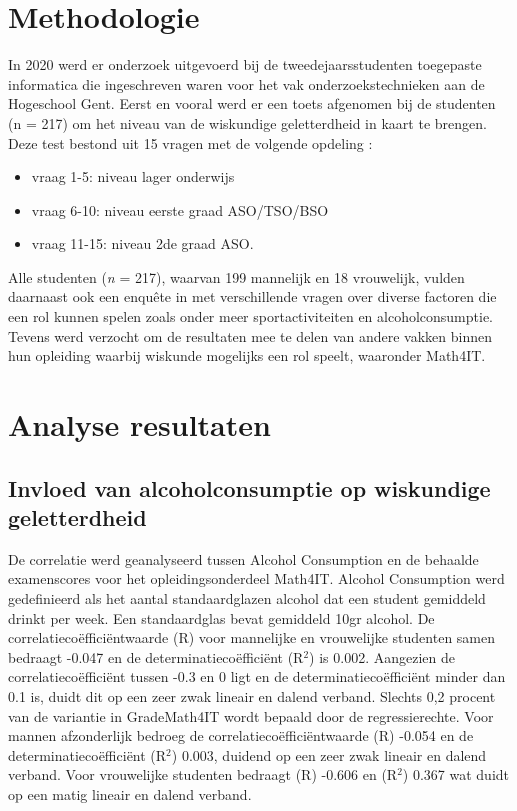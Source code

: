 \documentclass{hogent-article}
\begin{document}
\section{Methodologie}
In 2020 werd er onderzoek uitgevoerd bij de tweedejaarsstudenten toegepaste informatica die ingeschreven waren voor het vak onderzoekstechnieken aan de Hogeschool Gent. Eerst en vooral werd er een toets afgenomen bij de studenten (n = 217) om het niveau van de wiskundige geletterdheid in kaart te brengen. Deze test bestond uit 15 vragen met de volgende opdeling :
\begin{itemize}
    \item vraag 1-5: niveau lager onderwijs
    \item vraag 6-10: niveau eerste graad ASO/TSO/BSO
    \item vraag 11-15: niveau 2de graad ASO.
\end{itemize}
Alle studenten (\textit{n} = 217), waarvan 199 mannelijk en 18 vrouwelijk, vulden daarnaast ook een enquête in met verschillende vragen over diverse factoren die een rol kunnen spelen zoals onder meer sportactiviteiten en alcoholconsumptie.
Tevens werd verzocht om de resultaten mee te delen van andere vakken binnen hun opleiding waarbij wiskunde mogelijks een rol speelt, waaronder Math4IT.

\section{Analyse resultaten}
\subsection{Invloed van alcoholconsumptie op wiskundige geletterdheid}
De correlatie werd geanalyseerd tussen Alcohol Consumption en de behaalde examenscores voor het opleidingsonderdeel Math4IT. Alcohol Consumption werd gedefinieerd als het aantal standaardglazen alcohol dat een student gemiddeld drinkt per week. Een standaardglas bevat gemiddeld 10gr alcohol.
De correlatiecoëfficiëntwaarde (R) voor mannelijke en vrouwelijke studenten samen bedraagt -0.047 en de determinatiecoëfficiënt (R$^{2}$) is 0.002. Aangezien de correlatiecoëfficiënt tussen -0.3 en 0 ligt en de determinatiecoëfficiënt minder dan 0.1 is, duidt dit op een zeer zwak lineair en dalend verband. Slechts 0,2 procent van de variantie in GradeMath4IT wordt bepaald door de regressierechte.
Voor mannen afzonderlijk bedroeg de correlatiecoëfficiëntwaarde (R) -0.054 en de determinatiecoëfficiënt (R$^{2}$) 0.003, duidend op een zeer zwak lineair en dalend verband. Voor vrouwelijke studenten bedraagt (R) -0.606 en (R$^{2}$) 0.367 wat duidt op een matig lineair en dalend verband.
\end{document}
